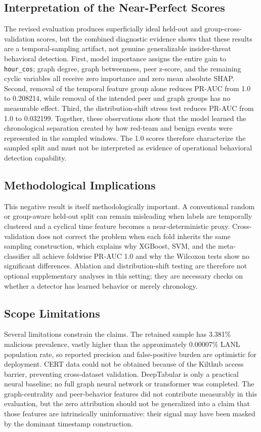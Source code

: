 \subsection{Interpretation of the Near-Perfect Scores}
The revised evaluation produces superficially ideal held-out and group-cross-validation scores, but the combined diagnostic evidence shows that these results are a temporal-sampling artifact, not genuine generalizable insider-threat behavioral detection. First, model importance assigns the entire gain to \texttt{hour\_cos}; graph degree, graph betweenness, peer z-score, and the remaining cyclic variables all receive zero importance and zero mean absolute SHAP. Second, removal of the temporal feature group alone reduces PR-AUC from 1.0 to 0.208214, while removal of the intended peer and graph groups has no measurable effect. Third, the distribution-shift stress test reduces PR-AUC from 1.0 to 0.032199. Together, these observations show that the model learned the chronological separation created by how red-team and benign events were represented in the sampled windows. The 1.0 scores therefore characterize the sampled split and must not be interpreted as evidence of operational behavioral detection capability.

\subsection{Methodological Implications}
This negative result is itself methodologically important. A conventional random or group-aware held-out split can remain misleading when labels are temporally clustered and a cyclical time feature becomes a near-deterministic proxy. Cross-validation does not correct the problem when each fold inherits the same sampling construction, which explains why XGBoost, SVM, and the meta-classifier all achieve foldwise PR-AUC 1.0 and why the Wilcoxon tests show no significant differences. Ablation and distribution-shift testing are therefore not optional supplementary analyses in this setting; they are necessary checks on whether a detector has learned behavior or merely chronology.

\subsection{Scope Limitations}
Several limitations constrain the claims. The retained sample has 3.381\% malicious prevalence, vastly higher than the approximately 0.00007\% LANL population rate, so reported precision and false-positive burden are optimistic for deployment. CERT data could not be obtained because of the Kilthub access barrier, preventing cross-dataset validation. DeepTabular is only a practical neural baseline; no full graph neural network or transformer was completed. The graph-centrality and peer-behavior features did not contribute measurably in this evaluation, but the zero attribution should not be generalized into a claim that those features are intrinsically uninformative: their signal may have been masked by the dominant timestamp construction.

